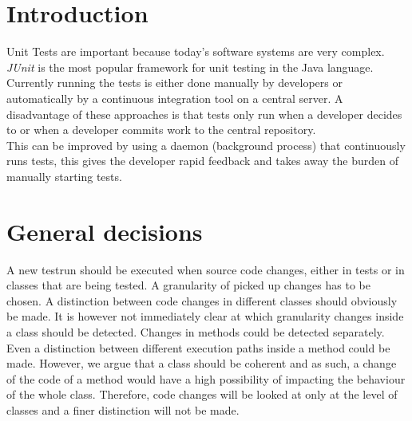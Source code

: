 \documentclass[i2]{oss}
\newcommand{\junit}{\emph{JUnit }}
\begin{document}

\maketitlepage
\newpage
\tableofcontents
\pagebreak




\section*{Introduction}
\label{ssec:introduction}

Unit Tests are important because today's software systems are very 
complex.
\junit is the most popular framework for unit testing in the Java 
language.
Currently running the tests is either done manually by developers or
automatically by a continuous integration tool on a central server.
A disadvantage of these approaches is that tests only run when a 
developer decides to or when a developer commits work to the central 
repository.\\
This can be improved by using a daemon (background process) that continuously runs tests, this gives the developer rapid feedback and 
takes away the burden of manually starting tests.

\section{General decisions}
\label{ssec:general-decisions}

A new testrun should be executed when source code changes, either in tests or in classes that are being tested. 
A granularity of picked up changes has to be chosen.
A distinction between code changes in different classes should obviously be made.
It is however not immediately clear at which granularity changes inside a class should be detected.
Changes in methods could be detected separately.
Even a distinction between different execution paths inside a method could be made.
However, we argue that a class should be coherent and as such, a change of the code of a method would have a high possibility of impacting the behaviour of the whole class.
Therefore, code changes will be looked at only at the level of classes and a finer distinction will not be made.\\
\end{document}

